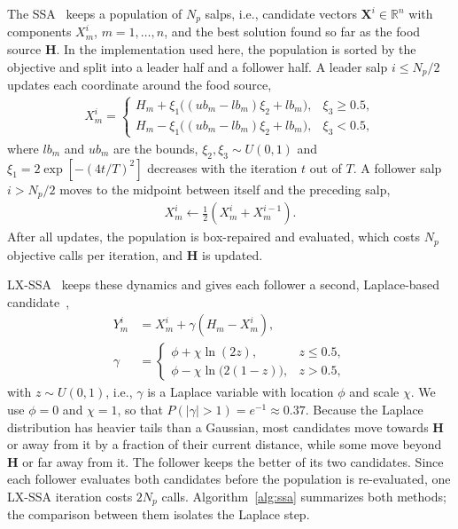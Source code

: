 \documentclass[journal,twoside]{IEEEtran}
\begin{document}
The SSA~\cite{Mirjalili2017} keeps a population of $N_p$ salps, i.e., candidate vectors $\mathbf X^i\in\mathbb R^{n}$ with components $X^i_m$, $m=1,\ldots,n$, and the best solution found so far as the food source $\mathbf H$. In the implementation used here, the population is sorted by the objective and split into a leader half and a follower half. A leader salp $i\le N_p/2$ updates each coordinate around the food source,
\begin{align}\label{eq:leader}
X_m^i =
\begin{cases}
H_m+\xi_1\big((ub_m-lb_m)\xi_2+lb_m\big), & \xi_3\ge0.5,\\
H_m-\xi_1\big((ub_m-lb_m)\xi_2+lb_m\big), & \xi_3<0.5,
\end{cases}
\end{align}
where $lb_m$ and $ub_m$ are the bounds, $\xi_2,\xi_3\sim U(0,1)$ and $\xi_1=2\exp[-(4t/T)^2]$ decreases with the iteration $t$ out of $T$. A follower salp $i>N_p/2$ moves to the midpoint between itself and the preceding salp,
\begin{align}\label{eq:follower}
X_m^i\leftarrow\tfrac{1}{2}\left(X_m^i+X_m^{i-1}\right).
\end{align}
After all updates, the population is box-repaired and evaluated, which costs $N_p$ objective calls per iteration, and $\mathbf H$ is updated.

LX-SSA~\cite{Solanki2023} keeps these dynamics and gives each follower a second, Laplace-based candidate~\cite{Solanki2023,Deep2007},
\begin{align}
Y_m^i&=X_m^i+\gamma\left(H_m-X_m^i\right),\nonumber\\
\gamma&=
\begin{cases}
\phi+\chi\ln(2z), & z\le0.5,\\
\phi-\chi\ln\bigl(2(1-z)\bigr), & z>0.5,
\end{cases}\label{eq:laplace}
\end{align}
with $z\sim U(0,1)$, i.e., $\gamma$ is a Laplace variable with location $\phi$ and scale $\chi$. We use $\phi=0$ and $\chi=1$, so that $P(|\gamma|>1)=e^{-1}\approx0.37$. Because the Laplace distribution has heavier tails than a Gaussian, most candidates move towards $\mathbf H$ or away from it by a fraction of their current distance, while some move beyond $\mathbf H$ or far away from it. The follower keeps the better of its two candidates. Since each follower evaluates both candidates before the population is re-evaluated, one LX-SSA iteration costs $2N_p$ calls. Algorithm~\ref{alg:ssa} summarizes both methods; the comparison between them isolates the Laplace step.
\end{document}
